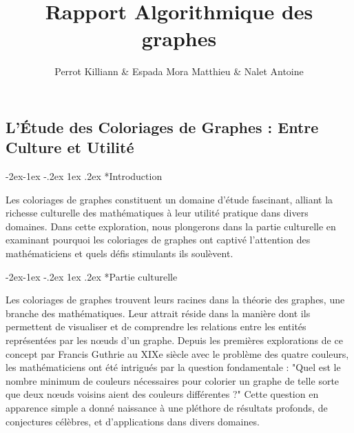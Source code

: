 \documentclass{report}
\title{\Huge Rapport Algorithmique des graphes}
\author{\huge Perrot Killiann \& Espada Mora Matthieu \& Nalet Antoine}
\date{}
\makeatletter
\renewcommand\subsection{\@startsection{subsection}{2}{\z@}%
  {-2ex\@plus -1ex \@minus -.2ex}%
  {1ex \@plus .2ex}%
  {\normalfont\bfseries}}
\makeatother
\begin{document}
\begin{titlepage}
    \centering
    \maketitle
    \newpage

    \tableofcontents
    \pagebreak
\end{titlepage}

\chapter{}
\section*{L'Étude des Coloriages de Graphes : Entre Culture et Utilité}

\subsection*{Introduction}

Les coloriages de graphes constituent un domaine d'étude fascinant, alliant la richesse culturelle des mathématiques à leur utilité pratique dans divers domaines. Dans cette exploration, nous plongerons dans la partie culturelle en examinant pourquoi les coloriages de graphes ont captivé l'attention des mathématiciens et quels défis stimulants ils soulèvent.

\subsection*{Partie culturelle}

Les coloriages de graphes trouvent leurs racines dans la théorie des graphes, une branche des mathématiques. Leur attrait réside dans la manière dont ils permettent de visualiser et de comprendre les relations entre les entités représentées par les nœuds d'un graphe. Depuis les premières explorations de ce concept par Francis Guthrie au XIXe siècle avec le problème des quatre couleurs, les mathématiciens ont été intrigués par la question fondamentale : "Quel est le nombre minimum de couleurs nécessaires pour colorier un graphe de telle sorte que deux nœuds voisins aient des couleurs différentes ?" Cette question en apparence simple a donné naissance à une pléthore de résultats profonds, de conjectures célèbres, et d'applications dans divers domaines.
\end{document}
